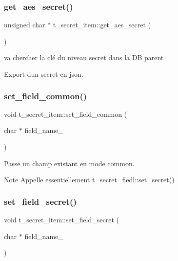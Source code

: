 \subsubsection{\texorpdfstring{get\+\_\+aes\+\_\+secret()}{get\_aes\_secret()}}
{\footnotesize\ttfamily unsigned char $\ast$ t\+\_\+secret\+\_\+item\+::get\+\_\+aes\+\_\+secret (\begin{DoxyParamCaption}{ }\end{DoxyParamCaption})}



va chercher la clé du niveau secret dans la DB parent 

Export d\textquotesingle{}un secret en json. \mbox{\label{classt__secret__item_aee6a52cf571677103cf279eb833de11f}} 
\subsubsection{\texorpdfstring{set\+\_\+field\+\_\+common()}{set\_field\_common()}}
{\footnotesize\ttfamily void t\+\_\+secret\+\_\+item\+::set\+\_\+field\+\_\+common (\begin{DoxyParamCaption}\item[{char $\ast$}]{field\+\_\+name\+\_\+ }\end{DoxyParamCaption})}



Passe un champ existant en mode \textquotesingle{}common\textquotesingle{}. 

\begin{DoxyNote}{Note}
Appelle essentiellement t\+\_\+secret\+\_\+fiedl\+::set\+\_\+secret() 
\end{DoxyNote}
\mbox{\label{classt__secret__item_a89e00d254657bdb437e8b84a668f4a61}} 
\subsubsection{\texorpdfstring{set\+\_\+field\+\_\+secret()}{set\_field\_secret()}}
{\footnotesize\ttfamily void t\+\_\+secret\+\_\+item\+::set\+\_\+field\+\_\+secret (\begin{DoxyParamCaption}\item[{char $\ast$}]{field\+\_\+name\+\_\+ }\end{DoxyParamCaption})}



